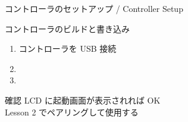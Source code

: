 \begin{frame}{コントローラのセットアップ / Controller Setup}
  \begin{block}{コントローラのビルドと書き込み}
    \begin{enumerate}
      \item コントローラを USB 接続
      \item {}
      \item {}
    \end{enumerate}
  \end{block}

  \vspace{1em}

  \begin{exampleblock}{確認}
    LCD に起動画面が表示されれば OK\\
    Lesson 2 でペアリングして使用する
  \end{exampleblock}
\end{frame}

